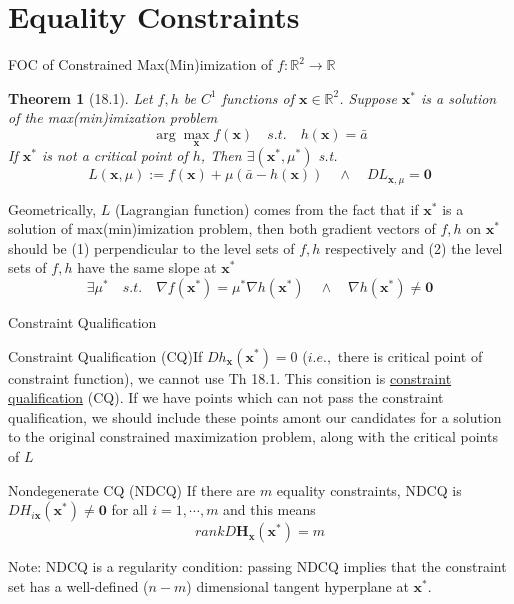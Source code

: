 \documentclass[a4paper,11pt]{article}
\newtheorem{thm}{Theorem}
\newcommand{\bb}{\mathbb}
\newcommand{\bd}{\mathbf}
\begin{document}
\section{Equality Constraints} %
\label{sec:equality_constraints}
\begin{frame}[t]{FOC of Constrained Max(Min)imization of $f:\bb{R}^2\rightarrow\bb{R}$}
	\begin{thm}
		[18.1] Let $f,h$ be $C^1$ functions of $\bd{x}\in\bb{R}^2$. Suppose $\bd{x^\ast}$ is a solution of the max(min)imization problem\[
			\arg\max_{\bd{x}} f(\bd{x}) \quad s.t. \quad h(\bd{x})=\bar a
		\] 
		If $\bd{x^\ast}$ is not a critical point of $h$, Then $\exists (\bd{x}^\ast,\mu^\ast)$ s.t. \[
			L(\bd{x},\mu):= f(\bd{x})+\mu(\bar{a}-h(\bd{x}))\quad\land\quad DL_{\bd{x},\mu}=\bd{0}
		\]
	\end{thm}
	Geometrically, $L$ (Lagrangian function) comes from the fact that if $\bd{x^\ast}$ is a solution of max(min)imization problem, then both gradient vectors of $f,h$ on $\bd{x^\ast}$ should be (1) perpendicular to the level sets of $f,h$ respectively and (2) the level sets of $f,h$ have the same slope at $\bd{x^\ast}$\[
		\exists \mu^\ast \quad s.t.\quad \nabla f (\bd{x^\ast}) = \mu^\ast \nabla h (\bd{x^\ast}) \quad \land\quad \nabla h(\bd{x^\ast})\neq\bd{0}
	\]
\end{frame}
\begin{frame}[t]{Constraint Qualification}
	\begin{block}
		{Constraint Qualification (CQ)}If $Dh_{\bd{x}}(\bd{x^\ast})=0$ ($i.e.,$ there is critical point of constraint function),  we cannot use Th 18.1. This consition is \uline{constraint qualification} (CQ). If we have points which can not pass the constraint qualification, we should include these points amont our candidates for a solution to the original constrained maximization problem, along with the critical points of $L$
	\end{block}
	\begin{block}
		{Nondegenerate CQ (NDCQ)} If there are $m$ equality constraints, NDCQ is $DH_{i\bd{x}}(\bd{x^\ast})\neq \bd{0}$ for all $i=1,\cdots,m$ and this means\[
			rank D\bd{H}_{\bd{x}}(\bd{x^\ast}) = m
		\]
	\end{block}
	Note: NDCQ is a regularity condition: passing NDCQ implies that the constraint set has a well-defined ($n-m$) dimensional tangent hyperplane at $\bd{x^\ast}$. 
\end{frame}
\end{document}
